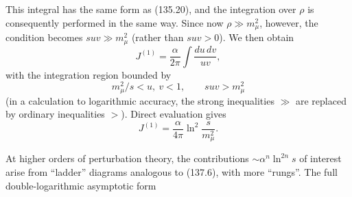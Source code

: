 This integral has the same form as (135.20), and the integration over $\rho$ is consequently performed in the same way. Since now $\rho\gg m_\mu^2$, however, the condition becomes $suv\gg m_\mu^2$ (rather than $suv>0$). We then obtain
\begin{equation}
J^{(1)}=\frac{\alpha}{2\pi}\int\frac{du\,dv}{uv},
\tag{137.12}
\end{equation}
with the integration region bounded by
\[
m_\mu^2/s<u,\ v<1,\qquad suv>m_\mu^2
\]
(in a calculation to logarithmic accuracy, the strong inequalities $\gg$ are replaced by ordinary inequalities $>$). Direct evaluation gives
\begin{equation}
J^{(1)}=\frac{\alpha}{4\pi}\ln^2\frac{s}{m_\mu^2}.
\tag{137.13}
\end{equation}

At higher orders of perturbation theory, the contributions $\sim\alpha^n\ln^{2n}s$ of interest arise from ``ladder'' diagrams analogous to (137.6), with more ``rungs''. The full double-logarithmic asymptotic form

